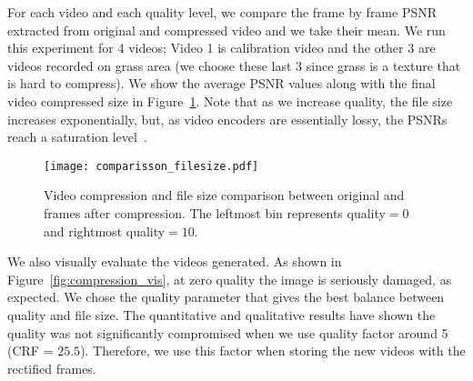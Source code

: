 For each video and each quality level, we compare the frame by frame PSNR extracted from original and compressed video
and we take their mean. %
%
%
We run this experiment for 4 videos; Video 1 is calibration video and the other 3 are videos recorded on grass area (we choose these last 3 since grass is a texture that is hard to compress).
We show the average PSNR values along with the final video compressed size in Figure~\ref{fig:compression_comp}.
Note that as we increase quality, the file size increases exponentially,
but, as video encoders are essentially lossy, the PSNRs reach a saturation level~\cite{web:ffmpeg}.
%
%
\begin{figure}[hbt!]
	\centering
	\texttt{[image: comparisson\_filesize.pdf]}
	\caption[Video compression and file size comparison]{Video compression and file size comparison between original and frames after compression.
	The leftmost bin represents quality$=0$ and rightmost quality$=10$.}
	\label{fig:compression_comp}
\end{figure}
%

We also visually evaluate the videos generated.
As shown in Figure~\ref{fig:compression_vis}, at zero quality the image is seriously damaged, as expected.
We chose the quality parameter that gives the best balance between quality and file size.
The quantitative and qualitative results have shown the quality was not significantly compromised when we use quality factor around 5 (CRF = $25.5$).
Therefore, we use this factor when storing the new videos with the rectified frames.

